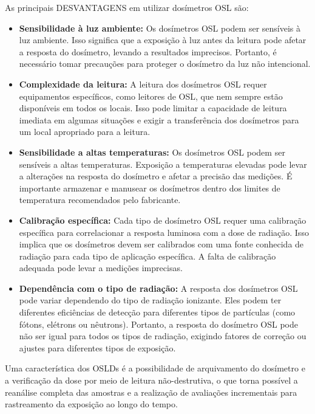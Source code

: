 \documentclass[11pt,a4paper]{article}
\begin{document}
		As principais \textcolor{CarnationPink}{DESVANTAGENS} em utilizar dosímetros OSL são:

		\begin{itemize}[label=\textcolor{CarnationPink}{$\blacktriangleright$}]
			\item \textbf{Sensibilidade à luz ambiente:} Os dosímetros OSL podem ser sensíveis à luz ambiente. Isso significa que a exposição à luz antes da leitura pode afetar a resposta do dosímetro, levando a resultados imprecisos. Portanto, é necessário tomar precauções para proteger o dosímetro da luz não intencional.
			\item \textbf{Complexidade da leitura:} A leitura dos dosímetros OSL requer equipamentos específicos, como leitores de OSL, que nem sempre estão disponíveis em todos os locais. Isso pode limitar a capacidade de leitura imediata em algumas situações e exigir a transferência dos dosímetros para um local apropriado para a leitura.
			\item \textbf{Sensibilidade a altas temperaturas:} Os dosímetros OSL podem ser sensíveis a altas temperaturas. Exposição a temperaturas elevadas pode levar a alterações na resposta do dosímetro e afetar a precisão das medições. É importante armazenar e manusear os dosímetros dentro dos limites de temperatura recomendados pelo fabricante.
			\item \textbf{Calibração específica:} Cada tipo de dosímetro OSL requer uma calibração específica para correlacionar a resposta luminosa com a dose de radiação. Isso implica que os dosímetros devem ser calibrados com uma fonte conhecida de radiação para cada tipo de aplicação específica. A falta de calibração adequada pode levar a medições imprecisas.
			\item \textbf{Dependência com o tipo de radiação:} A resposta dos dosímetros OSL pode variar dependendo do tipo de radiação ionizante. Eles podem ter diferentes eficiências de detecção para diferentes tipos de partículas (como fótons, elétrons ou nêutrons). Portanto, a resposta do dosímetro OSL pode não ser igual para todos os tipos de radiação, exigindo fatores de correção ou ajustes para diferentes tipos de exposição.
		\end{itemize}
		
		Uma característica dos OSLDs é a possibilidade de arquivamento do dosímetro e a verificação da dose por meio de leitura não-destrutiva, o que torna possível a reanálise completa das amostras e a realização de avaliações incrementais para rastreamento da exposição ao longo do tempo.
 
\end{document}
